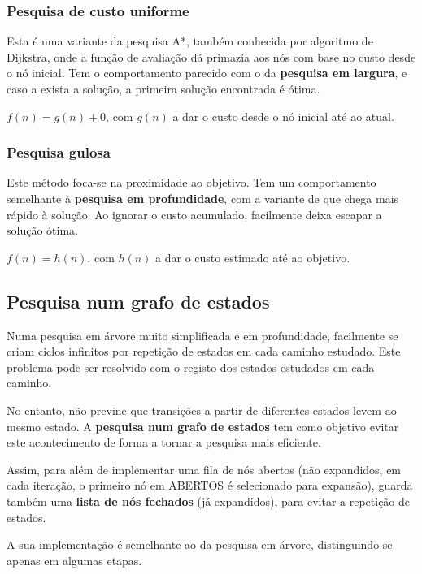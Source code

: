 \documentclass{article}
\begin{document}
\subsubsection*{Pesquisa de custo uniforme}

Esta é uma variante da pesquisa A*, também conhecida por algoritmo de Dijkstra, onde a
função de avaliação dá primazia aos nós com base no custo desde o nó inicial. Tem
o comportamento parecido com o da \textbf{pesquisa em largura}, e caso a exista a solução,
a primeira solução encontrada é ótima.

\vspace{2mm}

$f(n) = g(n) + 0$, com $g(n)$ a dar o custo desde o nó inicial até ao atual.

\subsubsection*{Pesquisa gulosa}

Este método foca-se na proximidade ao objetivo.
Tem um comportamento semelhante à \textbf{pesquisa em profundidade}, com a variante de que
chega mais rápido à solução. Ao ignorar o custo acumulado, facilmente deixa escapar a solução ótima.

\vspace{2mm}

$f(n) = h(n)$, com $h(n)$ a dar o custo estimado até ao objetivo.

\subsection{Pesquisa num grafo de estados}

Numa pesquisa em árvore muito simplificada e em profundidade, facilmente se criam ciclos
infinitos por repetição de estados em cada caminho estudado. Este problema pode ser
resolvido com o registo dos estados estudados em cada caminho.

No entanto, não previne que transições a partir de diferentes estados levem ao mesmo estado.
A \textbf{pesquisa num grafo de estados} tem como objetivo evitar este acontecimento de forma a
tornar a pesquisa mais eficiente.

Assim, para além de implementar uma fila de nós abertos (não expandidos,
em cada iteração, o primeiro nó em ABERTOS é selecionado para expansão), guarda também
uma \textbf{lista de nós fechados} (já expandidos), para evitar a repetição de estados.

A sua implementação é semelhante ao da pesquisa em árvore, distinguindo-se apenas em
algumas etapas.
\end{document}
